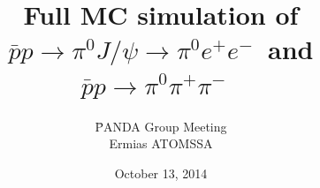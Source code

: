 \documentclass{beamer}
\begin{document}
\newcommand{\pnd}{\=PANDA }
\newcommand{\streama}{{\color{blue} Stream A~}}
\newcommand{\streamb}{{\color{red} Stream B~}}
\newcommand{\dm}{\mathrm{d}m}
\newcommand{\dpt}{\mathrm{d}p_T}
\newcommand{\pt}{p_T}
\newcommand{\tab}{\hspace{0.25cm}}

\newcommand{\pip}{{\normalsize$\pi^+$~}}
\newcommand{\pim}{{\normalsize$\pi^-$~}}
\newcommand{\pipm}{{\normalsize$\pi^{+}\pi^{-}$~}}
\newcommand{\epm}{{\normalsize$e^+e^-$}}
\newcommand{\piz}{{\normalsize$\pi^0$~}}
\newcommand{\jpsi}{{\normalsize$J/\psi$~}}
\newcommand{\jpsipbarp}{{\normalsize$J/\psi\rightarrow p\bar{p}$~}}

\newcommand{\pipT}{{\LARGE$\pi^+$~}}
\newcommand{\pimT}{{\LARGE$\pi^-$~}}
\newcommand{\pipmT}{{\LARGE$\pi^{+}\pi^{-}$~}}
\newcommand{\epmT}{{\LARGE$e^+e^-$}}
\newcommand{\pizT}{{\LARGE$\pi^0$~}}
\newcommand{\jpsiT}{{\LARGE$J/\psi$~}}
\newcommand{\jpsipbarpT}{{\LARGE$J/\psi\rightarrow p\bar{p}$~}}


\newcommand{\pintda}{$\pi$-N~TDA~}
\newcommand{\pintdas}{$\pi$-N~TDAs~}
\newcommand{\piantda}{$\pi$-$\bar{N}$~TDA~}
\newcommand{\piantdas}{$\pi$-$\bar{N}$~TDAs~}

\newcommand{\pizjpsi}{{\normalsize$\pi^0J/\psi$~}}
\newcommand{\pizpipm}{{\normalsize$\pi^0$\pipm}}
\newcommand{\pizjpsiT}{{\LARGE$\pi^0J/\psi$~}}
\newcommand{\pizpipmT}{{\LARGE$\pi^0$\pipmT}}

\newcommand{\sigrxn}{{\normalsize$\bar{p}p\rightarrow\pi^0J/\psi\rightarrow\pi^0e^+e^-$~}}
\newcommand{\sigrxnepem}{{\normalsize$\bar{p}p\rightarrow\pi^0\gamma^*\rightarrow\pi^0e^+e^-$~}}
\newcommand{\bgrxn}{{\normalsize$\bar{p}p\rightarrow\pi^0\pi^{+}\pi^{-}$~}}
\newcommand{\sigrxnT}{{\LARGE$\bar{p}p\rightarrow\pi^0J/\psi\rightarrow\pi^0e^+e^-$~}}
\newcommand{\sigrxnepemT}{{\LARGE$\bar{p}p\rightarrow\pi^0\gamma^*\rightarrow\pi^0e^+e^-$~}}
\newcommand{\bgrxnT}{{\LARGE$\bar{p}p\rightarrow\pi^0\pi^{+}\pi^{-}$~}}

\newcommand{\bgcut}{$-0.5<t[$GeV$^2]<0.6$, $2.96<M_{inv}[$GeV/c$^2] < 3.22$~}
\newcommand{\tcut}{$-0.5<t[$GeV$^2]<0.6$~}
\newcommand{\ucut}{$-0.5<u[$GeV$^2]<0.6$~}


\title[\pnd Group Meeting, TDA]{Full MC simulation of \sigrxn and \bgrxn}

\author[Ermias ATOMSSA]{\pnd Group Meeting\\ \vskip 0.5cm Ermias ATOMSSA}

\date[October 13, 2014]{October 13, 2014}
\end{document}

